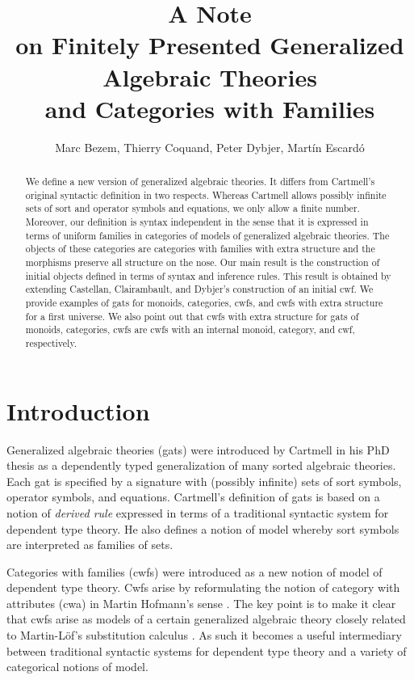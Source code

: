 \documentclass{lmcs}
\title[Generalized Algebraic Theories and Categories with Families]{A Note\\ on Finitely Presented Generalized Algebraic Theories\\and Categories with Families}\author{Marc Bezem, Thierry Coquand, Peter Dybjer, Mart\'in Escard\'o}
\begin{document}
\maketitle

\begin{abstract}
We define a new version of generalized algebraic theories. It differs from Cartmell's original syntactic definition in two respects. Whereas Cartmell allows possibly infinite sets of sort and operator symbols and equations, we only allow a finite number. Moreover, our definition is syntax independent in the sense that it is expressed in terms of uniform families in categories of models of generalized algebraic theories. 
The objects of these categories are categories with families with extra structure and the morphisms preserve all structure on the nose. Our main result is the construction of initial objects defined in terms of syntax and inference rules. This result is obtained by extending Castellan, Clairambault, and Dybjer's construction of an initial cwf. We provide examples of gats for monoids, categories, cwfs, and cwfs with extra structure for a first universe. We also point out that cwfs with extra structure for  gats of monoids, categories, cwfs are cwfs with an internal monoid, category, and cwf, respectively.
\end{abstract}

\section{Introduction}

Generalized algebraic theories (gats) were introduced by Cartmell in his PhD thesis \cite{cartmell:phd} as a dependently typed generalization of many sorted algebraic theories. Each gat is specified by a signature with (possibly infinite) sets of sort symbols, operator symbols, and equations. Cartmell's definition of gats \cite{cartmell:phd,cartmell:apal} is based on a notion of {\em derived rule} expressed in terms of a traditional syntactic system for dependent type theory. He also defines a notion of model whereby sort symbols are interpreted as families of sets.

Categories with families (cwfs) \cite{dybjer:torino} were introduced as a new notion of model of dependent type theory. Cwfs arise by reformulating the notion of category with attributes (cwa) in Martin Hofmann's sense \cite{hofmann:csl}. The key point is to make it clear that cwfs arise as models of a certain generalized algebraic theory closely related to Martin-Löf's substitution calculus \cite{martinlof:gbg92}. As such it becomes a useful intermediary between traditional syntactic systems for dependent type theory and a variety of categorical notions of model.
\end{document}
